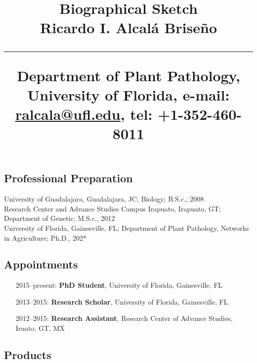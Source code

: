 \documentclass[svgnames,11pt]{article}
\title{%
        \vspace{-2\baselineskip}
            \normalsize
            Biographical Sketch\\
            {\large\textbf{Ricardo I. Alcal\'a Brise\~no}}\\
            \vspace{0.5\baselineskip}
            \hrule
            \vspace{0.5\baselineskip}
            Department of Plant Pathology, University of Florida,
            e-mail: \href{mailto:ralcala@ufl.edu}{ralcala@ufl.edu},
            tel: +1-352-460-8011
        \vspace{-1.5ex}
        }
\date{}
\author{}
\begin{document}
\maketitle
\vspace{-4\baselineskip}

\subsection{Professional Preparation}

    University of Guadalajara, Guadalajara, JC;
        Biology;
        B.S.c., 2008
        \\
    Research Center and Advance Studies Campus Irapuato, Irapuato, GT;
        Department of Genetic;
        M.S.c., 2012
        \\
    University of Florida, Gainesville, FL;
        Department of Plant Pathology, Networks in Agriculture; 
        Ph.D., 202*
        \\

\subsection{Appointments}

\begin{itemize}[label={--9999:},leftmargin=*,itemsep=0pt]

    \item[2015--present:]
        \textbf{PhD Student},
        University of Florida,
        Gainesville, FL

    \item[2013--2015:]
        \textbf{Research Scholar},
        University of Florida,
        Gainesville, FL

    \item[2012--2015:]
        \textbf{Research Assistant},
        Research Center of Advance Studies,
        Iruato, GT, MX

\end{itemize}

\subsection{Products}
\end{document}
